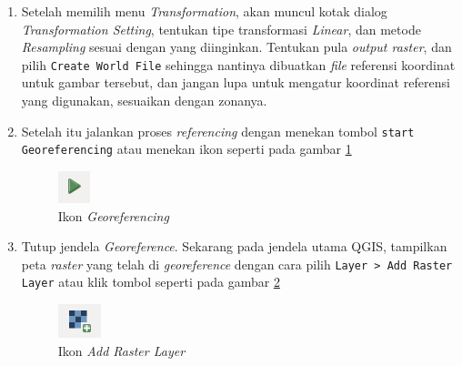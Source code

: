 \begin{enumerate}[1.]
  \item Setelah memilih menu \textit{Transformation}, akan muncul kotak dialog \textit{Transformation Setting}, tentukan tipe transformasi \textit{Linear}, dan metode \textit{Resampling} sesuai dengan yang diinginkan. Tentukan pula \textit{output raster}, dan pilih \verb|Create World File| sehingga nantinya dibuatkan \textit{file} referensi koordinat untuk gambar tersebut, dan jangan lupa untuk mengatur koordinat referensi yang digunakan, sesuaikan dengan zonanya.
  
  \item Setelah itu jalankan proses \textit{referencing} dengan menekan tombol \texttt{start \- Georeferencing} atau menekan ikon seperti pada gambar \ref{fig:startgeoref}
  
  \begin{figure}[H]
    \centering
    \includegraphics[scale=1]{./resources/034-icon-start-georef}
    \caption{Ikon \textit{Georeferencing}}
    \label{fig:startgeoref}
  \end{figure}
  
  \item Tutup jendela \textit{Georeference}. Sekarang pada jendela utama QGIS, tampilkan peta \textit{raster} yang telah di \textit{georeference} dengan cara pilih \texttt{Layer > Add Raster Layer} atau klik tombol seperti pada gambar \ref{fig:addraster}
  
  \begin{figure}[H]
    \centering
    \includegraphics[scale=1]{./resources/035-icon-add-raster}
    \caption{Ikon \textit{Add Raster Layer}}
    \label{fig:addraster}
  \end{figure}
  
\end{enumerate}